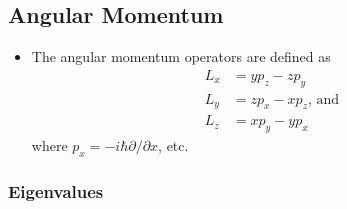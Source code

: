 \documentclass{article}
\begin{document}
\subsection{Angular Momentum}

\begin{itemize}
  \item The angular momentum operators are defined as \begin{align*}
          L_x & = y p_z - z p_y              \\
          L_y & = z p_x - x p_z \text{, and} \\
          L_z & = x p_y - y p_x
        \end{align*} where $p_x = -i \hbar \partial / \partial x$, etc.
\end{itemize}

\subsubsection{Eigenvalues}
\end{document}
